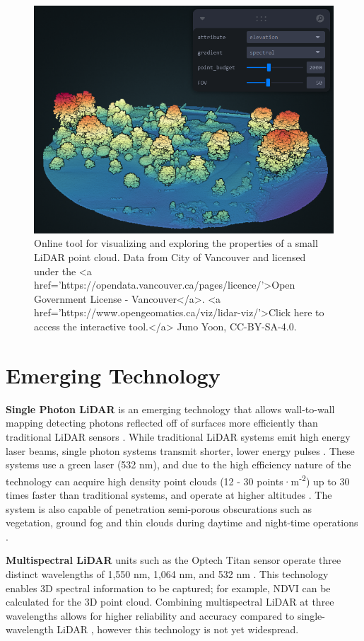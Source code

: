 \documentclass[
]{book}
\begin{document}
\begin{figure}
\includegraphics[width=0.75\linewidth]{images/15-lidar-visualization-static} \caption{Online tool for visualizing and exploring the properties of a small LiDAR point cloud. Data from City of Vancouver and licensed under the <a href='https://opendata.vancouver.ca/pages/licence/'>Open Government License - Vancouver</a>. <a href='https://www.opengeomatics.ca/viz/lidar-viz/'>Click here to access the interactive tool.</a> Juno Yoon, CC-BY-SA-4.0.}\label{fig:15-lidar-visualization-static}
\end{figure}

\hypertarget{emerging-technology}{%
\section{Emerging Technology}\label{emerging-technology}}

\textbf{Single Photon LiDAR} is an emerging technology that allows wall-to-wall mapping detecting photons reflected off of surfaces more efficiently than traditional LiDAR sensors \citep{swatantran_rapid_2016}. While traditional LiDAR systems emit high energy laser beams, single photon systems transmit shorter, lower energy pulses \citep{swatantran_rapid_2016}. These systems use a green laser (532 nm), and due to the high efficiency nature of the technology can acquire high density point clouds (12 - 30 points·m\textsuperscript{-2}) up to 30 times faster than traditional systems, and operate at higher altitudes \citep{swatantran_rapid_2016}. The system is also capable of penetration semi-porous obscurations such as vegetation, ground fog and thin clouds during daytime and night-time operations \citep{swatantran_rapid_2016}.

\textbf{Multispectral LiDAR} units such as the Optech Titan sensor operate three distinct wavelengths of 1,550 nm, 1,064 nm, and 532 nm \citep{morsy_multispectral_2017}. This technology enables 3D spectral information to be captured; for example, NDVI can be calculated for the 3D point cloud. Combining multispectral LiDAR at three wavelengths allows for higher reliability and accuracy compared to single-wavelength LiDAR \citep{morsy_multispectral_2017}, however this technology is not yet widespread.
\end{document}
